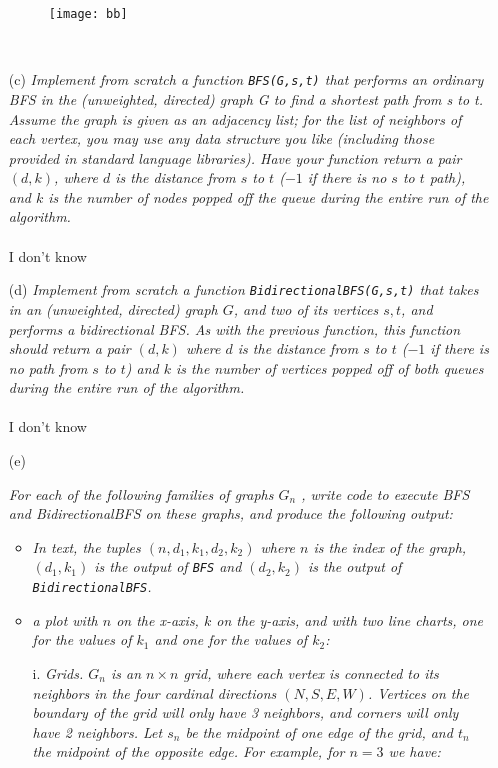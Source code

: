\documentclass[12pt]{article} \setlength{\oddsidemargin}{0in}
\begin{document}
\begin{enumerate}
  \begin{figure}[h]
  \centering \texttt{[image: bb]}
\end{figure}
  \\
  \item[(c)]{\textit{Implement from scratch a function \texttt{BFS(G,s,t)} that performs an ordinary BFS in the (unweighted, directed) graph G to find a shortest path from s to t. Assume
the graph is given as an adjacency list; for the list of neighbors of each vertex,
you may use any data structure you like (including those provided in standard
language libraries). Have your function return a pair $(d, k)$, where $d$ is the distance
from $s$ to $t$ ($-1$ if there is no $s$ to $t$ path), and $k$ is the number of nodes popped
off the queue during the entire run of the algorithm.}}
  \\\\
  I don't know
  \\
\item[(d)]{\textit{Implement from scratch a function \texttt{BidirectionalBFS(G,s,t)} that takes in an (unweighted, directed) graph $G$, and two of its vertices $s,t$, and performs a bidirectional BFS. As with the previous function, this function should return a pair
$(d, k)$ where $d$ is the distance from $s$ to $t$ ($-1$ if there is no path from $s$ to $t$) and $k$ is the number of vertices popped off of both queues during the entire run of the
algorithm.}}
  \\\\
  I don't know
  \\
\item[(e)]{\textit{For each of the following families of graphs $G_n$ , write code to execute BFS and BidirectionalBFS on these graphs, and produce the following output:}
    \begin{itemize}
    \item \textit{In text, the tuples $(n, d_1, k_1, d_2, k_2)$ where $n$ is the index of the graph, $(d_1, k_1)$ is the output of \texttt{BFS} and $(d_2, k_2)$ is the output of \texttt{BidirectionalBFS}.}
    \item \textit{a plot with $n$ on the x-axis, $k$ on the y-axis, and with two line charts, one for the values of $k_1$ and one for the values of $k_2$:}
    \end{itemize}
    \begin{enumerate}
    \item[i.] \textit{Grids. $G_n$ is an $n \times n$ grid, where each vertex is connected to its neighbors in the four cardinal directions $(N,S,E,W)$. Vertices on the boundary of the grid
will only have 3 neighbors, and corners will only have 2 neighbors. Let $s_n$
be the midpoint of one edge of the grid, and $t_n$ the midpoint of the opposite
edge. For example, for $n = 3$ we have:}


\end{enumerate}}
\end{enumerate}
\end{document}
